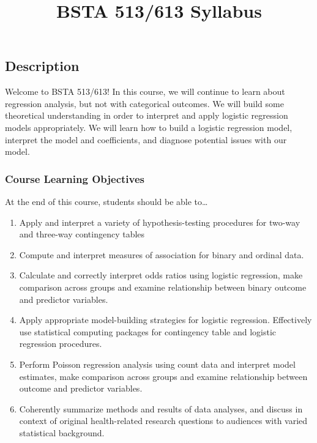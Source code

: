 \documentclass[
  letterpaper,
  DIV=11,
  numbers=noendperiod]{scrartcl}
\title{BSTA 513/613 Syllabus}
\author{}
\date{}
\begin{document}
\maketitle
\ifdefined\Shaded\renewenvironment{Shaded}{\begin{tcolorbox}[interior hidden, boxrule=0pt, enhanced, borderline west={3pt}{0pt}{shadecolor}, breakable, frame hidden, sharp corners]}{\end{tcolorbox}}\fi

\hypertarget{description}{%
\subsection{Description}\label{description}}

Welcome to BSTA 513/613! In this course, we will continue to learn about
regression analysis, but not with categorical outcomes. We will build
some theoretical understanding in order to interpret and apply logistic
regression models appropriately. We will learn how to build a logistic
regression model, interpret the model and coefficients, and diagnose
potential issues with our model.

\hypertarget{course-learning-objectives}{%
\subsubsection{Course Learning
Objectives}\label{course-learning-objectives}}

At the end of this course, students should be able to\ldots{}

\begin{enumerate}
\def\labelenumi{\arabic{enumi}.}
\item
  Apply and interpret a variety of hypothesis-testing procedures for
  two-way and three-way contingency tables
\item
  Compute and interpret measures of association for binary and ordinal
  data.
\item
  Calculate and correctly interpret odds ratios using logistic
  regression, make comparison across groups and examine relationship
  between binary outcome and predictor variables.
\item
  Apply appropriate model-building strategies for logistic regression.
  Effectively use statistical computing packages for contingency table
  and logistic regression procedures.
\item
  Perform Poisson regression analysis using count data and interpret
  model estimates, make comparison across groups and examine
  relationship between outcome and predictor variables.
\item
  Coherently summarize methods and results of data analyses, and discuss
  in context of original health-related research questions to audiences
  with varied statistical background.
\end{enumerate}
\end{document}
